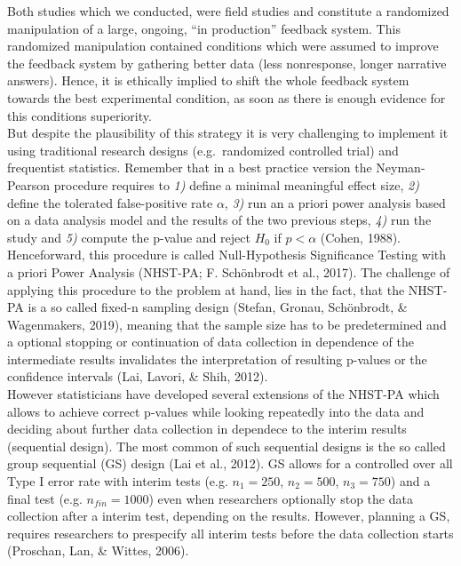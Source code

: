 \documentclass[man]{apa6}
\begin{document}
Both studies which we conducted, were field studies and constitute a randomized manipulation of a large, ongoing, \enquote{in production} feedback system. This randomized manipulation contained conditions which were assumed to improve the feedback system by gathering better data (less nonresponse, longer narrative answers). Hence, it is ethically implied to shift the whole feedback system towards the best experimental condition, as soon as there is enough evidence for this conditions superiority.\\
But despite the plausibility of this strategy it is very challenging to implement it using traditional research designs (e.g.~randomized controlled trial) and frequentist statistics. Remember that in a best practice version the Neyman-Pearson procedure requires to \emph{1)} define a minimal meaningful effect size, \emph{2)} define the tolerated false-positive rate \(\alpha\), \emph{3)} run an a priori power analysis based on a data analysis model and the results of the two previous steps, \emph{4)} run the study and \emph{5)} compute the p-value and reject \(H_0\) if \(p < \alpha\) (Cohen, 1988). Henceforward, this procedure is called Null-Hypothesis Significance Testing with a priori Power Analysis (NHST-PA; F. Schönbrodt et al., 2017). The challenge of applying this procedure to the problem at hand, lies in the fact, that the NHST-PA is a so called fixed-n sampling design (Stefan, Gronau, Schönbrodt, \& Wagenmakers, 2019), meaning that the sample size has to be predetermined and a optional stopping or continuation of data collection in dependence of the intermediate results invalidates the interpretation of resulting p-values or the confidence intervals (Lai, Lavori, \& Shih, 2012).\\
However statisticians have developed several extensions of the NHST-PA which allows to achieve correct p-values while looking repeatedly into the data and deciding about further data collection in dependece to the interim results (sequential design). The most common of such sequential designs is the so called group sequential (GS) design (Lai et al., 2012). GS allows for a controlled over all Type I error rate with interim tests (e.g. \(n_1 = 250\), \(n_2 = 500\), \(n_3 = 750\)) and a final test (e.g. \(n_{fin} = 1000\)) even when researchers optionally stop the data collection after a interim test, depending on the results. However, planning a GS, requires researchers to prespecify all interim tests before the data collection starts (Proschan, Lan, \& Wittes, 2006).\\
\end{document}
